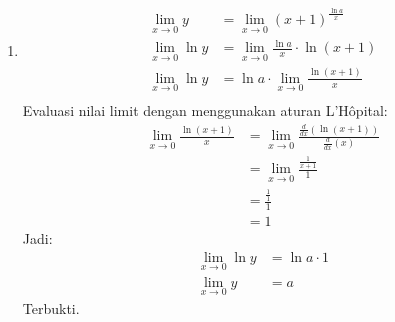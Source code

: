 \documentclass[12pt, letterpaper]{article}
\begin{document}
\begin{enumerate}
\begin{enumerate}
        \item 
        \begin{align*}
            \lim_{x \to 0} y &= \lim_{x \to 0} (x + 1)^{\frac{\ln a}{x}} \\
        \lim_{x \to 0} \ln y &= \lim_{x \to 0} \frac{\ln a}{x} \cdot \ln (x + 1) \\
        \lim_{x \to 0} \ln y &= \ln a \cdot \lim_{x \to 0} \frac{\ln (x+1)}{x} \\
        \end{align*}
        Evaluasi nilai limit dengan menggunakan aturan L’Hôpital:
        \begin{align*}
        \lim_{x \to 0} \frac{\ln (x+1)}{x}
        &= \lim_{x \to 0} \frac{\frac{d}{dx} (\ln (x+1))}{\frac{d}{dx}(x)} \\
        &= \lim_{x \to 0} \frac{\frac{1}{x +1}}{1} \\
        &= \frac{\frac{1}{1}}{1} \\
        &= 1
        \end{align*}
        Jadi:
        \begin{align*}
        \lim_{x \to 0} \ln y &= \ln a \cdot 1 \\
            \lim_{x \to 0} y &= a
        \end{align*}
        Terbukti.
        
    \end{enumerate}
    
\end{enumerate}
\end{document}
